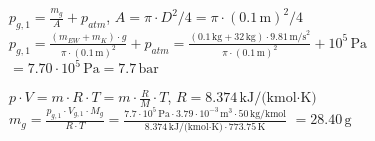 \( p_{g,1} = \frac{m_g}{A} + p_{atm} \), \( A = \pi \cdot D^2 / 4 = \pi \cdot (0.1 \, \text{m})^2 / 4 \)  
\( p_{g,1} = \frac{(m_{EW} + m_K) \cdot g}{\pi \cdot (0.1 \, \text{m})^2} + p_{atm} = \frac{(0.1 \, \text{kg} + 32 \, \text{kg}) \cdot 9.81 \, \text{m/s}^2}{\pi \cdot (0.1 \, \text{m})^2} + 10^5 \, \text{Pa} \)  
\( = 7.70 \cdot 10^5 \, \text{Pa} = 7.7 \, \text{bar} \)  

\( p \cdot V = m \cdot R \cdot T = m \cdot \frac{R}{M} \cdot T \), \( R = 8.374 \, \text{kJ/(kmol·K)} \)  
\( m_g = \frac{p_{g,1} \cdot V_{g,1} \cdot M_g}{R \cdot T} = \frac{7.7 \cdot 10^5 \, \text{Pa} \cdot 3.79 \cdot 10^{-3} \, \text{m}^3 \cdot 50 \, \text{kg/kmol}}{8.374 \, \text{kJ/(kmol·K)} \cdot 773.75 \, \text{K}} \)  
\( = 28.40 \, \text{g} \)